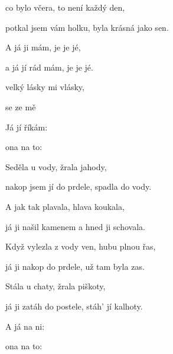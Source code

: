 

\zs
{} co bylo včera, to není každý den,

potkal jsem vám holku, byla krásná jako sen.
\ks

\zr
A já ji  mám, je je jé,

a já jí  rád mám, je je jé.

 velký lásky  mi vlásky,

 se ze mě 
\kr

\zr \kr

\zs
Já jí říkám: 

ona na to: 
\ks

\zr \kr

\zs
Seděla u vody, žrala jahody,

nakop jsem jí do prdele, spadla do vody.
\ks

\zr \kr

\zs
A jak tak plavala, hlava koukala,

já ji našil kamenem a hned ji schovala.
\ks

\zr \kr

\zs
Když vylezla z vody ven, hubu plnou řas,

já ji nakop do prdele, už tam byla zas.
\ks

\zr \kr

\zs
Stála u chaty, žrala piškoty,

já ji zatáh do postele, stáh' jí kalhoty.
\ks

\zr \kr

\zs
A já na ni: 

ona na to: 
\ks

\zr \kr

\kp





